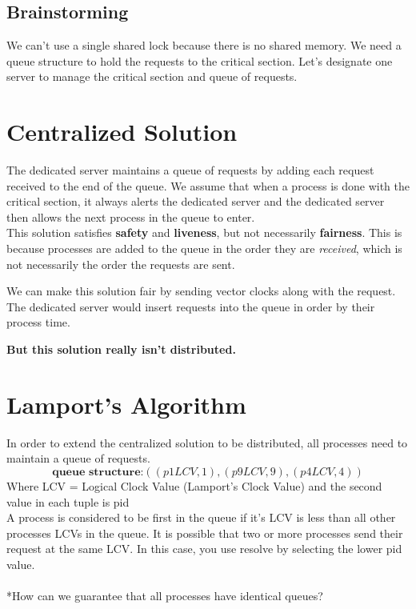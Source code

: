 \documentclass[twoside]{article}
\begin{document}
\subsection{Brainstorming}
We can't use a single shared lock because there is no shared memory.
We need a queue structure to hold the requests to the critical section.
Let's designate one server to manage the critical section and queue of requests.
\section{Centralized Solution}
The dedicated server maintains a queue of requests by adding each request received to the end of the queue.
We assume that when a process is done with the critical section, it always alerts the dedicated server and the dedicated
 server then allows the next process in the queue to enter. \\
This solution satisfies \textbf{safety} and \textbf{liveness}, but not necessarily \textbf{fairness}. This is because
processes are added to the queue in the order they are \textit{received}, which is not necessarily the order the
requests are sent. \par
We can make this solution fair by sending vector clocks along with the request. The dedicated server would insert
requests into the queue in order by their process time. \par
\textbf{But this solution really isn't distributed.}

\section{Lamport's Algorithm}
In order to extend the centralized solution to be distributed, all processes need to maintain a queue of requests. \\
\[\textbf{queue structure:} ((p1 LCV, 1), (p9 LCV, 9), (p4 LCV,4)) \]
Where LCV = Logical Clock Value (Lamport's Clock Value) and the second value in each tuple is pid \\
A process is considered to be first in the queue if it's LCV is less than all other processes LCVs in the queue. It is
possible that two or more processes send their request at the same LCV. In this case, you use resolve by selecting the
lower pid value. \\
\\
*How can we guarantee that all processes have identical queues? \\
\end{document}
